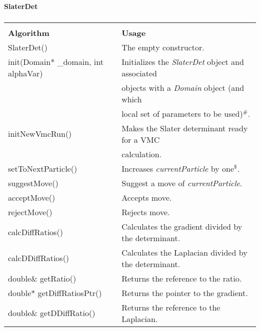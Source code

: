 \begin{table}[hbtp]
\begin{center} {\large \bf SlaterDet} \\ 
$\phantom{a}$ \\
\begin{tabular}{ll}
\hline\\ 
{\bf Algorithm}                      & {\bf Usage} \\
SlaterDet()                          & The empty constructor. \\
init(Domain* \_domain, int alphaVar) & Initializes the \emph{SlaterDet} object
and associated\\
                                     & objects with a \emph{Domain}
object (and which\\
& local set of parameters to be used)$^{\#}$.\\
initNewVmcRun()                      & Makes the Slater determinant
ready for a VMC \\
&  calculation.\\
setToNextParticle()                  & Increases \emph{currentParticle}
by one$^{\$}$.\\
suggestMove()                        & Suggest a move of \emph{currentParticle}.\\
acceptMove()                         & Accepts move.\\
rejectMove()                         & Rejects move.\\
calcDiffRatios()                     & Calculates the gradient divided
by the determinant. \\
calcDDiffRatios()                    & Calculates the Laplacian divided
by the determinant.\\
double{\footnotesize\&} getRatio()                  & Returns the reference to the ratio.\\
double* getDiffRatiosPtr()           & Returns the pointer to the gradient.\\
double{\footnotesize\&} getDDiffRatio()             & Returns the reference to the Laplacian.\\  [10pt]
\hline
\end{tabular} 
\end{center}


\end{table}

